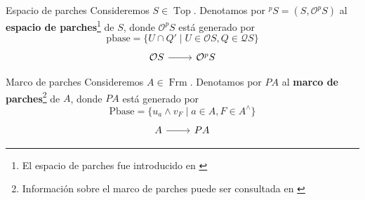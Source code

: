 \documentclass[compress,12pt]{beamer}
\DeclareMathOperator{\Frm}{Frm}
\DeclareMathOperator{\Top}{Top}
\begin{document}
\begin{frame}[fragile]{Espacio de parches}
    Consideremos $S\in \Top$. Denotamos por $^pS=(S, \mathcal{O}^pS)$ al \textbf{espacio de parches}\footnote{El espacio de parches fue introducido en \cite{hochster1969prime}} de $S$, donde $\mathcal{O}^pS$ está generado por
    \[
    \mbox{pbase}=\{U\cap Q'\mid U\in \mathcal{O}S, Q\in \mathcal{Q}S\}
    \]
   \[\begin{tikzcd}
	{\mathcal{O}S} & {\mathcal{O}^pS}
	\arrow[from=1-1, to=1-2]
\end{tikzcd}\]

\end{frame}

\begin{frame}[fragile]{Marco de parches}
Consideremos $A\in \Frm$. Denotamos por $PA$ al \textbf{marco de parches}\footnote{Información sobre el marco de parches puede ser consultada en \cite{sexton2006point, sexton2006ordinal}} de $A$, donde $PA$ está generado por
\[
\mbox{Pbase}=\{u_a\wedge v_F\mid a\in A, F\in A^\wedge\}
\]
\[\begin{tikzcd}
	A & PA
	\arrow[from=1-1, to=1-2]
\end{tikzcd}\]

\end{frame}
\end{document}
